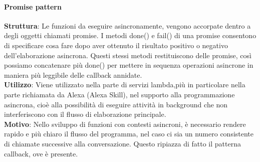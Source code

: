 \documentclass[../DefinizioneDiProdotto_v3.0.0.tex]{subfiles}
\begin{document}
\paragraph{Promise pattern}\mbox{}
\begin{addmargin}[1em]{2em}%
	\textbf{Struttura}: Le funzioni da eseguire asincronamente, vengono accorpate dentro a degli oggetti chiamati promise. I metodi done() e fail() di una promise consentono di specificare cosa fare dopo aver ottenuto il risultato positivo o negativo dell’elaborazione asincrona. Questi stessi metodi restituiscono delle promise, così possiamo concatenare più done() per mettere in sequenza operazioni asincrone in maniera più leggibile delle callback annidate.\\
	\textbf{Utilizzo}: Viene utilizzato nella parte di servizi lambda,più in particolare nella parte richiamata da Alexa (Alexa Skill), nel supporto alla programmazione asincrona, cioè alla possibilità di eseguire attività in background che non interferiscono con il flusso di elaborazione principale.\\
	\textbf{Motivo}: Nello sviluppo di funzioni con contesti asincroni, è necessario rendere rapido e più chiaro il flusso del programma, nel caso ci sia un numero consistente di chiamate successive alla conversazione. Questo ripiazza di fatto il patterna callback, ove è presente.\\
\end{addmargin}
\end{document}

